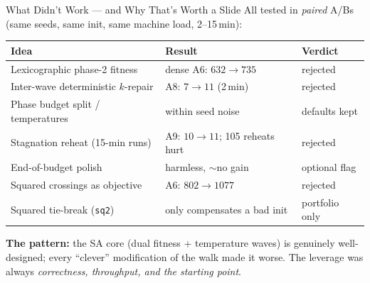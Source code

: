 \begin{frame}{What Didn't Work --- and Why That's Worth a Slide}
  All tested in \emph{paired} A/Bs (same seeds, same init, same machine load, 2--15\,min):
  \medskip
  \begin{center}
    \begin{tabular}{lll}
      \toprule
      \textbf{Idea} & \textbf{Result} & \textbf{Verdict} \\
      \midrule
      Lexicographic phase-2 fitness     & dense A6: $632\to 735$            & rejected \\
      Inter-wave deterministic $k$-repair & A8: $7\to 11$ (2\,min)          & rejected \\
      Phase budget split / temperatures  & within seed noise                 & defaults kept \\
      Stagnation reheat (15-min runs)    & A9: $10\to 11$; 105 reheats hurt  & rejected \\
      End-of-budget polish               & harmless, $\sim$no gain           & optional flag \\
      Squared crossings as objective     & A6: $802\to 1077$                 & rejected \\
      Squared tie-break (\texttt{sq2})   & only compensates a bad init       & portfolio only \\
      \bottomrule
    \end{tabular}
  \end{center}
  \medskip
  \textbf{The pattern:} the SA core (dual fitness + temperature waves) is genuinely
  well-designed; every ``clever'' modification of the walk made it worse.
  The leverage was always \emph{correctness, throughput, and the starting point}.
\end{frame}

